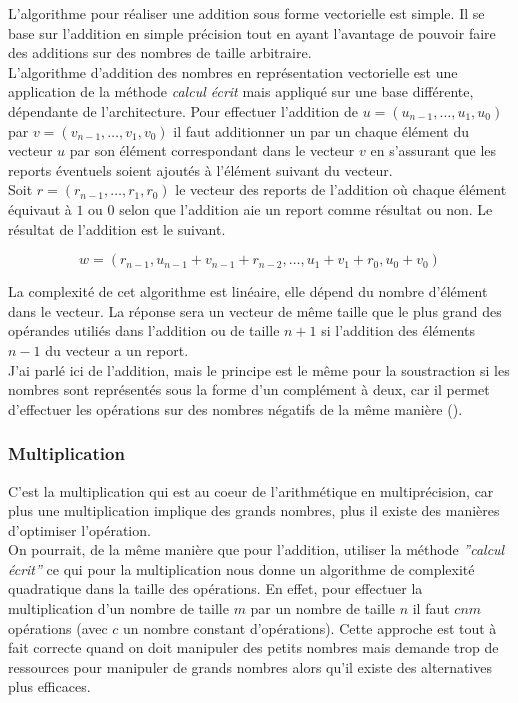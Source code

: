 \documentclass[letterpaper]{article}
\begin{document}
L'algorithme pour réaliser une addition sous forme vectorielle est simple.
Il se base sur l'addition en simple précision tout en ayant l'avantage de
pouvoir faire des additions sur des nombres de taille arbitraire. \\

L'algorithme d'addition des nombres en représentation vectorielle est une
application de la méthode \emph{calcul écrit} mais appliqué sur une base
différente, dépendante de l'architecture. Pour effectuer l'addition de $u =
(u_{n - 1}, \dots, u_1, u_0)$ par $v = (v_{n - 1}, \dots, v_1, v_0)$ il faut
additionner un par un chaque élément du vecteur $u$ par son élément
correspondant dans le vecteur $v$ en s'assurant que les reports éventuels
soient ajoutés à l'élément suivant du vecteur.\\

Soit $r = (r_{n - 1}, \dots, r_{1}, r_{0})$ le vecteur des reports de
l'addition où chaque élément équivaut à $1$ ou $0$ selon que l'addition aie un
report comme résultat ou non. Le résultat de l'addition est le suivant.

$$w = (r_{n - 1}, u_{n - 1} + v_{n - 1} + r_{n - 2}, \dots, u_1 + v_1 + r_0, u_0 + v_0)$$

La complexité de cet algorithme est linéaire, elle  dépend du nombre d'élément
dans le vecteur.
La réponse sera un vecteur de même taille que le plus grand des opérandes
utiliés dans l'addition ou de taille $n + 1$ si l'addition des éléments $n - 1$
du vecteur a un report.\\

J'ai parlé ici de l'addition, mais le principe est le même pour la soustraction
si les nombres sont représentés sous la forme d'un complément à deux, car il
permet d'effectuer les opérations sur des nombres négatifs de la même
manière (\cite{wikicomplementtwo}).

\subsubsection{Multiplication}

C'est la multiplication qui est au coeur de l'arithmétique en multiprécision,
car plus une multiplication implique des grands nombres, plus il existe des
manières d'optimiser l'opération.\\

On pourrait, de la même manière que pour l'addition, utiliser la méthode
\emph{''calcul écrit''} ce qui pour la multiplication nous donne un algorithme de
complexité quadratique dans la taille des opérations.
En effet, pour effectuer la multiplication d'un nombre de taille $m$ par un nombre
de taille $n$ il faut $cnm$ opérations (avec $c$ un nombre constant
d'opérations).
Cette approche est tout à fait correcte quand on doit manipuler des petits
nombres mais demande trop de ressources pour manipuler de grands nombres alors
qu'il existe des alternatives plus efficaces.
\end{document}
